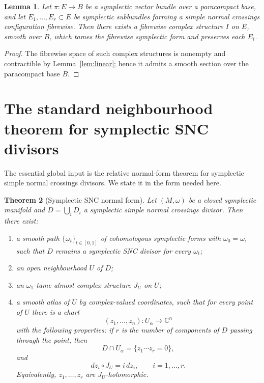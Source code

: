 \documentclass[11pt]{article}
\newtheorem{theorem}{Theorem}
\newtheorem{lemma}[theorem]{Lemma}
\theoremstyle{definition}
\numberwithin{equation}{section}
\begin{document}
\begin{lemma}\label{lem:bundle-linear}
Let $\pi:E\to B$ be a symplectic vector bundle over a paracompact base, and let $E_1,\dots,E_r\subset E$ be symplectic subbundles forming a simple normal crossings configuration fibrewise.  Then there exists a fibrewise complex structure $I$ on $E$, smooth over $B$, which tames the fibrewise symplectic form and preserves each $E_i$.
\end{lemma}

\begin{proof}
The fibrewise space of such complex structures is nonempty and contractible by Lemma~\ref{lem:linear}; hence it admits a smooth section over the paracompact base $B$.
\end{proof}

\section{The standard neighbourhood theorem for symplectic SNC divisors}

The essential global input is the relative normal-form theorem for symplectic simple normal crossings divisors.  We state it in the form needed here.

\begin{theorem}[Symplectic SNC normal form]\label{thm:normal-form}
Let $(M,\omega)$ be a closed symplectic manifold and $D=\bigcup_iD_i$ a symplectic simple normal crossings divisor.  Then there exist:
\begin{enumerate}[label=(\roman*)]
\item a smooth path $\{\omega_t\}_{t\in[0,1]}$ of cohomologous symplectic forms with $\omega_0=\omega$, such that $D$ remains a symplectic SNC divisor for every $\omega_t$;
\item an open neighbourhood $U$ of $D$;
\item an $\omega_1$-tame almost complex structure $J_U$ on $U$;
\item a smooth atlas of $U$ by complex-valued coordinates, such that for every point of $U$ there is a chart
\[
(z_1,\dots,z_n):U_\alpha\to\mathbb C^n
\]
with the following properties: if $r$ is the number of components of $D$ passing through the point, then
\[
D\cap U_\alpha=\{z_1\cdots z_r=0\},
\]
and
\[
dz_i\circ J_U=i\,dz_i,\qquad i=1,\dots,r.
\]
Equivalently, $z_1,\dots,z_r$ are $J_U$-holomorphic.
\end{enumerate}
\end{theorem}
\end{document}
